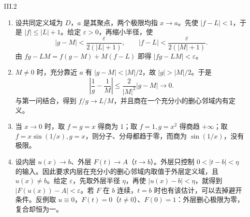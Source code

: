 \begin{solution}{III.2}
\begin{enumerate}
 \item 设共同定义域为 \(D\)，\(a\) 是其聚点，两个极限均指 \(x\to a\)。先使 \(|f-L|<1\)，于是 \(|f|\le|L|+1\)。给定 \(\varepsilon>0\)，再缩小半径，使
 \[
 |g-M|<\frac{\varepsilon}{2(|L|+1)},\qquad
 |f-L|<\frac{\varepsilon}{2(|M|+1)}.
 \]
 由 \(fg-LM=f(g-M)+M(f-L)\) 即得 \(|fg-LM|<\varepsilon\)。
 \item \(M\ne0\) 时，充分靠近 \(a\) 有 \(|g-M|<|M|/2\)，故 \(|g|>|M|/2\)。于是
 \[
 \left|\frac1g-\frac1M\right|
 \le\frac{2}{|M|^2}|g-M|\longrightarrow0.
 \]
 与第一问结合，得到 \(f/g\to L/M\)，并且商在一个充分小的删心邻域内有定义。
 \item 当 \(x\to0\) 时，取 \(f=g=x\) 得商为 \(1\)；取 \(f=1,g=x^2\) 得商趋 \(+\infty\)；取 \(f=x\sin(1/x),g=x\)，则分子、分母都趋于零，而商为 \(\sin(1/x)\)，没有极限。
 \item 设内层 \(u(x)\to b\)、外层 \(F(t)\to A\)（\(t\to b\)）。外层只控制 \(0<|t-b|<\eta\) 的输入。因此要求内层在充分小的删心邻域内取值于外层定义域，且 \(u(x)\ne b\)。给定 \(\varepsilon\)，先取外层半径 \(\eta\)，再使 \(|u(x)-b|<\eta\)，就得到 \(|F(u(x))-A|<\varepsilon\)。若 \(F\) 在 \(b\) 连续，\(t=b\) 时也有该估计，可以去掉避开条件。反例取 \(u\equiv0\)，\(F(t)=0\)（\(t\ne0\)）、\(F(0)=1\)：外层删心极限为零，复合却恒为一。
\end{enumerate}
\end{solution}

